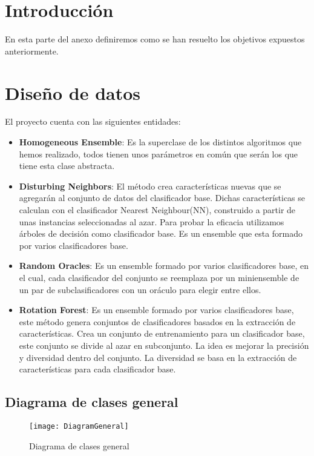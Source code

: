 
\section{Introducción}
En esta parte del anexo definiremos como se han resuelto los objetivos expuestos anteriormente.
\section{Diseño de datos}
El proyecto cuenta con las siguientes entidades:
\begin{itemize}
	\item \textbf{Homogeneous Ensemble}: Es la superclase de los distintos algoritmos que hemos realizado, todos tienen unos parámetros en común que serán los que tiene esta clase abstracta.
	\item \textbf{Disturbing Neighbors}: El método crea características nuevas que se agregarán al conjunto de datos del clasificador base. Dichas características se calculan con el clasificador Nearest Neighbour(NN), construido a partir de unas instancias seleccionadas al azar. Para probar la eficacia utilizamos árboles de decisión como clasificador base. Es un ensemble que esta formado por varios clasificadores base.
	\item \textbf{Random Oracles}: Es un ensemble formado por varios clasificadores base, en el cual, cada clasificador del conjunto se reemplaza por un miniensemble de un par de subclasificadores con un oráculo para elegir entre ellos.
	\item \textbf{Rotation Forest}: Es un ensemble formado por varios clasificadores base, este método genera conjuntos de clasificadores basados en la extracción de características. Crea un conjunto de entrenamiento para un clasificador base, este conjunto se divide al azar en subconjunto. La idea es mejorar la precisión y diversidad dentro del conjunto. La diversidad se basa en la extracción de características para cada clasificador base.
\end{itemize}


\subsection{Diagrama de clases general}\label{diagram-general}
\begin{figure}
\centering
\texttt{[image: DiagramGeneral]}
\caption{Diagrama de clases general}
\label{fig:DiagramGeneral}
\end{figure}

